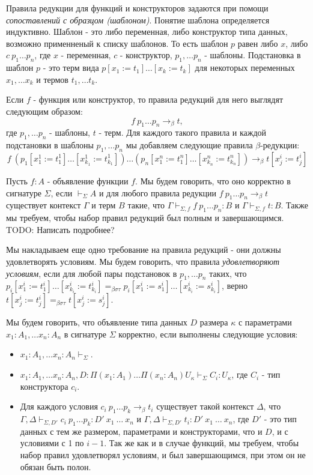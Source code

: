 \documentclass{amsart}
\theoremstyle{definition}
\theoremstyle{remark}
\newcommand{\bs}{\beta\sigma}
\newcommand{\bst}{\bs\tau}
\newcommand{\ebst}{=_{\bst}}
\numberwithin{figure}{section}
\begin{document}
Правила редукции для функций и конструкторов задаются при помощи \emph{сопоставлений с образцом (шаблоном)}.
Понятие шаблона определяется индуктивно.
Шаблон - это либо переменная, либо конструктор типа данных, возможно применненый к списку шаблонов.
То есть шаблон $p$ равен либо $x$, либо $c\ p_1 \ldots p_n$, где $x$ - переменная, $c$ - конструктор, $p_1, \ldots p_n$ - шаблоны.
Подстановка в шаблон $p$ - это терм вида $p[x_1 := t_1] \ldots [x_k := t_k]$ для некоторых переменных $x_1, \ldots x_k$ и термов $t_1, \ldots t_k$.

Если $f$ - функция или конструктор, то правила редукций для него выглядят следующим образом:
\[ f\ p_1 \ldots p_n \to_\beta t, \]
где $p_1, \ldots p_n$ - шаблоны, $t$ - терм.
Для каждого такого правила и каждой подстановки в шаблоны $p_1, \ldots p_n$ мы добавляем следующие правила $\beta$-редукции:
\[ f\ (p_1[x^1_1 := t^1_1] \ldots [x^1_{k_1} := t^1_{k_1}]) \ldots (p_n[x^n_1 := t^n_1] \ldots [x^n_{k_n} := t^n_{k_n}]) \to_\beta t[x^i_j := t^i_j] \]

Пусть $f : A$ - объявление функции $f$.
Мы будем говорить, что оно корректно в сигнатуре $\Sigma$, если $\vdash_\Sigma A$ и для любого правила редукции $f\ p_1 \ldots p_n \to_\beta t$
    существует контекст $\Gamma$ и терм $B$ такие, что $\Gamma \vdash_{\Sigma,f} f\ p_1 \ldots p_n : B$ и $\Gamma \vdash_{\Sigma,f} t : B$.
Также мы требуем, чтобы набор правил редукций был полным и завершающимся. TODO: Написать подробнее?

Мы накладываем еще одно требование на правила редукций - они должны удовлетворять условиям.
Мы будем говорить, что правила \emph{удовлетворяют условиям}, если для любой пары подстановок в $p_1, \ldots p_n$ таких,
    что $p_i[x^i_1 := t^i_1] \ldots [x^i_{k_i} := t^i_{k_i}] \ebst p_i[x^i_1 := s^i_1] \ldots [x^i_{k_i} := s^i_{k_i}]$,
    верно $t[x^i_j := t^i_j] \ebst t[x^i_j := s^i_j]$.

Мы будем говорить, что объявление типа данных $D$ размера $\kappa$ с параметрами $x_1 : A_1, \ldots x_n : A_n$ в сигнатуре $\Sigma$ корректно, если выполнены следующие условия:
\begin{itemize}
\item $x_1 : A_1, \ldots x_n : A_n \vdash_\Sigma$.
\item $x_1 : A_1, \ldots x_n : A_n, D : \Pi (x_1 : A_1) \ldots \Pi (x_n : A_n) U_\kappa \vdash_\Sigma C_i : U_\kappa$, где $C_i$ - тип конструктора $c_i$.
\item Для каждого условия $c_i\ p_1 \ldots p_k \to_\beta t_i$ существует такой контекст $\Delta$,
    что $\Gamma, \Delta \vdash_{\Sigma,D'} c_i\ p_1 \ldots p_k : D'\ x_1\ \ldots\ x_n$ и $\Gamma, \Delta \vdash_{\Sigma,D'} t_i : D'\ x_1\ \ldots\ x_n$,
    где $D'$ - это тип данных с тем же размером, параметрами и конструкторами, что и $D$, и с условиями с 1 по $i - 1$.
    Так же как и в случае функций, мы требуем, чтобы набор правил удовлетворял условиям, и был завершающимся, при этом он не обязан быть полон.
\end{itemize}
\end{document}
